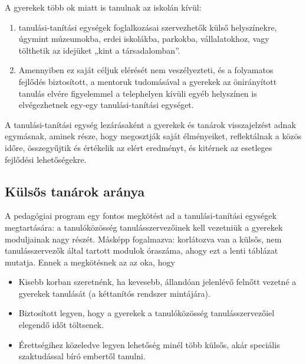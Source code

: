 A gyerekek több ok miatt is tanulnak az iskolán kívül:

\begin{enumerate}
\def\labelenumi{\arabic{enumi}.}
\item
  tanulási-tanítási egységek foglalkozásai szervezhetők külső
  helyszínekre, úgymint múzeumokba, erdei iskolákba, parkokba,
  vállalatokhoz, vagy tölthetik az idejüket „kint a társadalomban''.
\item
  Amennyiben ez saját céljuk elérését nem veszélyezteti, és a folyamatos
  fejlődés biztosított, a mentoruk tudomásával a gyerekek az
  önirányított tanulás elvére figyelemmel a telephelyen kívüli egyéb
  helyszínen is elvégezhetnek egy-egy tanulási-tanítási egységet.
\end{enumerate}

A tanulási-tanítási egység lezárásaként a gyerekek és tanárok
visszajelzést adnak egymásnak, aminek része, hogy megosztják saját
élményeiket, reflektálnak a közös időre, összegyűjtik és értékelik az
elért eredményt, és kitérnek az esetleges fejlődési lehetőségekre.

\hypertarget{kulsos-tanarok-aranya}{%
\subsection{Külsős tanárok aránya}\label{kulsos-tanarok-aranya}}

A pedagógiai program egy fontos megkötést ad a tanulási-tanítási
egységek megtartására: a tanulóközösség tanulásszervezőinek kell
vezetniük a gyerekek moduljainak nagy részét.  Másképp fogalmazva:
korlátozva van a külsős, nem tanulásszervezők által tartott modulok
óraszáma, ahogy ezt a lenti táblázat mutatja. Ennek a megkötésnek az az
oka, hogy

\begin{itemize}
\item
  Kisebb korban szeretnénk, ha kevesebb, állandóan jelenlévő felnőtt
  vezetné a gyerekek tanulását (a kéttanítós rendszer mintájára).
\item
  Biztosított legyen, hogy a gyerekek a tanulóközösség
  tanulásszervezőiel elegendő időt töltsenek.
\item
  Érettségihez közeledve legyen lehetőség minél több külsős, akár\break
  speciális szaktudással bíró embertől tanulni.
\end{itemize}


